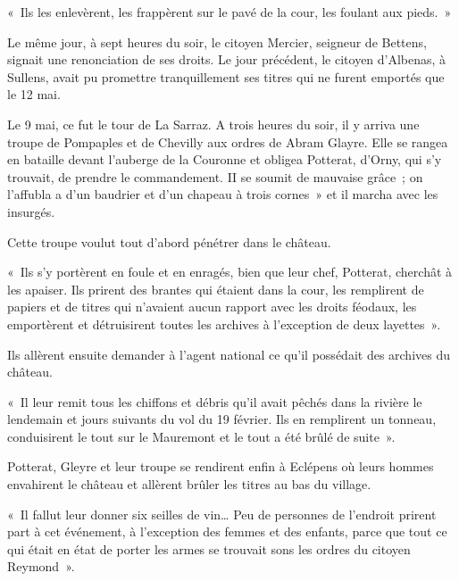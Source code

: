 \documentclass[french,twoside]{book} %
\newenvironment{quoteblock}%
  {\begin{quoting}}
  {\end{quoting}}
\newenvironment{quotebar}{%
    \def\FrameCommand{{\color{rubric!10!}\vrule width 0.5em} \hspace{0.9em}}%
    \def\OuterFrameSep{\itemsep} %
    \MakeFramed {\advance\hsize-\width \FrameRestore}
  }%
  {%
    \endMakeFramed
  }
\renewenvironment{quoteblock}%
  {%
    \savenotes
    \setstretch{0.9}
    \normalfont
    \begin{quotebar}
  }
  {%
    \end{quotebar}
    \spewnotes
  }
\begin{document}
\begin{quoteblock}
\noindent « Ils les enlevèrent, les frappèrent sur le pavé de la cour, les foulant aux pieds. »\end{quoteblock}

\noindent Le même jour, à sept heures du soir, le citoyen Mercier, seigneur de Bettens, signait une renonciation de ses droits. Le jour précédent, le citoyen d’Albenas, à Sullens, avait pu promettre tranquillement ses titres qui ne furent emportés que le 12 mai.\par
Le 9 mai, ce fut le tour de La Sarraz. A trois heures du soir, il y arriva une troupe de Pompaples et de Chevilly aux ordres de Abram Glayre. Elle se rangea en bataille devant l’auberge de la Couronne et obligea Potterat, d’Orny, qui s’y trouvait, de prendre le commandement. II se soumit de mauvaise grâce ; on l’affubla a d’un baudrier et d’un chapeau à trois cornes » et il marcha avec les insurgés.\par
Cette troupe voulut tout d’abord pénétrer dans le château.\par

\begin{quoteblock}
 \noindent « Ils s’y portèrent en foule et en enragés, bien que leur chef, Potterat, cherchât à les apaiser. Ils prirent des brantes qui étaient dans la cour, les remplirent de papiers et de titres qui n’avaient aucun rapport avec les droits féodaux, les emportèrent et détruisirent toutes les archives à l’exception de deux layettes ».
 \end{quoteblock}

\noindent Ils allèrent ensuite demander à l’agent national ce qu’il possédait des archives du château.\par

\begin{quoteblock}
 \noindent « Il leur remit tous les chiffons et débris qu’il avait pêchés dans la rivière le lendemain et jours suivants du vol du 19 février. Ils en remplirent un tonneau, conduisirent le tout sur le Mauremont et le tout a été brûlé de suite ».
 \end{quoteblock}

\noindent Potterat, Gleyre et leur troupe se rendirent enfin à Eclépens où leurs hommes envahirent le château et allèrent brûler les titres au bas du village.\par

\begin{quoteblock}
 \noindent « Il fallut leur donner six seilles de vin… Peu de personnes de l’endroit prirent part à cet événement, à l’exception des femmes et des enfants, parce que tout ce qui était en état de porter les armes se trouvait sons les ordres du citoyen Reymond ».
 \end{quoteblock}
\end{document}
